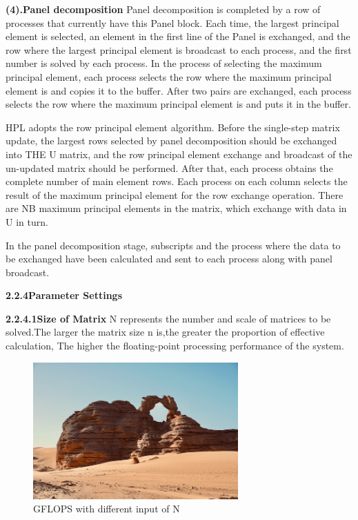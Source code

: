 \documentclass[a4paper,12pt]{article}
\begin{document}
\textbf{(4).Panel decomposition}
Panel decomposition is completed by a row of processes that currently have this Panel block. Each time, the largest principal element is selected, an element in the first line of the Panel is exchanged, and the row where the largest principal element is broadcast to each process, and the first number is solved by each process.
In the process of selecting the maximum principal element, each process selects the row where the maximum principal element is and copies it to the buffer. After two pairs are exchanged, each process selects the row where the maximum principal element is and puts it in the buffer.

HPL adopts the row principal element algorithm. Before the single-step matrix update, the largest rows selected by panel decomposition should be exchanged into THE U matrix, and the row principal element exchange and broadcast of the un-updated matrix should be performed. After that, each process obtains the complete number of main element rows. Each process on each column selects the result of the maximum principal element for the row exchange operation. There are NB maximum principal elements in the matrix, which exchange with data in U in turn.

In the panel decomposition stage, subscripts and the process where the data to be exchanged have been calculated and sent to each process along with panel broadcast.

\textbf{2.2.4Parameter Settings}

\textbf{2.2.4.1Size of Matrix}
N represents the number and scale of matrices to be solved.The larger the matrix size n is,the greater the proportion of effective calculation, The higher the floating-point processing performance of the system.

\begin{figure}[H]
    \centering
    \includegraphics[width=0.7\textwidth]{GFLOPS_N.png}
    \caption{GFLOPS with different input of N}
    \label{fig:gflops_n}
\end{figure}
\end{document}
